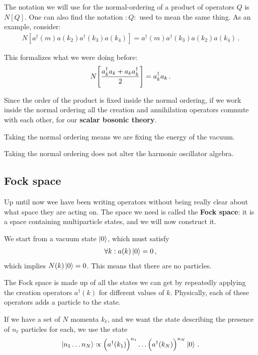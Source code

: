 \documentclass[main.tex]{subfiles}
\begin{document}
The notation we will use for the normal-ordering of a product of operators \(Q\) is \(N[Q]\). One can also find the notation \(: Q :\) used to mean the same thing. 
As an example, consider: 
%
\begin{align}
N[ a ^\dag(m) a(k_2 ) a ^\dag (k_3 ) a (k_4)]
= a ^\dag (m ) a ^\dag (k_3 ) a (k_2  ) a (k_4 )
\,.
\end{align}

This formalizes what we were doing before: 
%
\begin{align}
N \qty[ \frac{a_k ^\dag a_k + a_k a_k ^\dag}{2}] = a_k ^\dag a_k
\,.
\end{align}

Since the order of the product is fixed inside the normal ordering, if we work inside the normal ordering all the creation and annihilation operators commute with each other, for our \textbf{scalar bosonic theory}. 

Taking the normal ordering means we are fixing the energy of the vacuum.

Taking the normal ordering does not alter the harmonic oscillator algebra. 

\subsection{Fock space}

Up until now wee have been writing operators without being really clear about what space they are acting on. 
The space we need is called the \textbf{Fock space}: it is a space containing multiparticle states, and we will now construct it. 

We start from a vacuum state \(\ket{0}\), which must satisfy 
%
\begin{align}
\forall k : 
a(k) \ket{0} = 0
\,,
\end{align}
%
which implies \(N(k) \ket{0} = 0\). This means that there are no particles. 

The Fock space is made up of all the states we can get by repeatedly applying the creation operators \(a ^\dag (k)\) for different values of \(k\).
Physically, each of these operators adds a particle to the state. 

If we have a set of \(N\) momenta \(k_\ell\), and we want the state describing the presence of \(n_\ell\) particles for each, we use the state 
%
\begin{align}
\ket{n_1 \dots n_N} \propto \qty(a ^\dag (k_1 ))^{n_1} \dots
\qty( a ^\dag (k_N))^{n_N} \ket{0}
\,.
\end{align}
\end{document}
